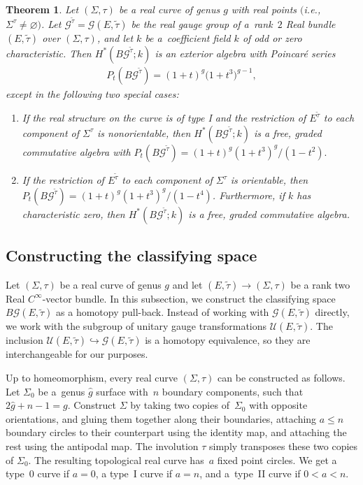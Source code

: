\documentclass[10pt,a4paper]{amsart}
\numberwithin{equation}{section}
\newtheorem{Theorem}{Theorem}[section]
\begin{document}
\begin{Theorem}\label{bgring}
Let $(\Sigma, \tau)$ be a real curve of genus $g$ with real points $($i.e., $\Sigma^{\tau}\neq \varnothing)$. Let ${\mathcal G}^{\tilde{\tau}} = {\mathcal G}(E,\tilde{\tau})$ be the real gauge group of a~rank~$2$ Real bundle $(E,\tilde{\tau})$ over $(\Sigma, \tau)$, and let $k$ be a~coefficient field $k$ of odd or zero characteristic. Then $H^*(B{\mathcal G}^{{\tilde{\tau}}}; k)$ is an exterior algebra with Poincar\'e series \begin{gather*}P_t(B{\mathcal G}^{\tilde{\tau}}) =(1+t)^g\big(1+t^3\big)^{g-1},\end{gather*}
except in the following two special cases:
\begin{enumerate}\itemsep=0pt
	\item[$1.$] If the real structure on the curve is of type I and the restriction of $E^{{\tilde{\tau}}}$ to each component of $\Sigma^{\tau}$ is nonorientable, then $H^*(B{\mathcal G}^{\tilde{\tau}};k)$ is a free, graded commutative algebra with $P_t(B{\mathcal G}^{{\tilde{\tau}}}) = (1+t)^g(1+t^3)^{g}/(1-t^2).$
	
	\item[$2.$] If the restriction of $E^{{\tilde{\tau}}}$ to each component of $\Sigma^{\tau}$ is orientable, then $P_t(B{\mathcal G}^{{\tilde{\tau}}}) = (1+t)^g(1+t^3)^{g}/(1-t^4)$. Furthermore, if $k$ has characteristic zero, then $H^*(B{\mathcal G}^{\tilde{\tau}};k)$ is a free, graded commutative algebra.
\end{enumerate}
\end{Theorem}

\subsection{Constructing the classifying space}\label{constructtheclasspace}

Let $(\Sigma, \tau)$ be a real curve of genus $g$ and let $ (E,{\tilde{\tau}}) \rightarrow (\Sigma,\tau)$ be a rank two Real $C^{\infty}$-vector bundle. In this subsection, we construct the classifying space $B{\mathcal G}(E,\tilde{\tau})$ as a homotopy pull-back. Instead of working with ${\mathcal G}(E,\tilde{\tau})$ directly, we work with the subgroup of unitary gauge transformations $\mathcal{U}(E,\tilde{\tau})$. The inclusion $\mathcal{U}(E,\tilde{\tau}) \hookrightarrow {\mathcal G}(E,\tilde{\tau})$ is a homotopy equivalence, so they are interchangeable for our purposes.

Up to homeomorphism, every real curve $(\Sigma, \tau)$ can be constructed as follows. Let $\Sigma_0$ be a~genus $\hat{g}$ surface with~$n$ boundary components, such that $2\hat{g}+n-1 = g$. Construct $\Sigma$ by taking two copies of~$\Sigma_0$ with opposite orientations, and gluing them together along their boundaries, attaching $a \leq n$ boundary circles to their counterpart using the identity map, and attaching the rest using the antipodal map. The involution $\tau$ simply transposes these two copies of $\Sigma_0$. The resulting topological real curve has~$a$ f\/ixed point circles. We get a type~0 curve if $a=0$, a type~I curve if $a = n$, and a~type~II curve if $0< a< n$.
\end{document}
